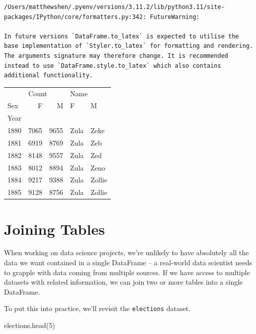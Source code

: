 \documentclass[
  letterpaper,
  DIV=11,
  numbers=noendperiod]{scrreprt}
\newenvironment{Shaded}{\begin{snugshade}}{\end{snugshade}}
\newcommand{\DecValTok}[1]{\textcolor[rgb]{0.68,0.00,0.00}{#1}}
\newcommand{\NormalTok}[1]{\textcolor[rgb]{0.00,0.23,0.31}{#1}}
\begin{document}
\begin{verbatim}
/Users/matthewshen/.pyenv/versions/3.11.2/lib/python3.11/site-packages/IPython/core/formatters.py:342: FutureWarning:

In future versions `DataFrame.to_latex` is expected to utilise the base implementation of `Styler.to_latex` for formatting and rendering. The arguments signature may therefore change. It is recommended instead to use `DataFrame.style.to_latex` which also contains additional functionality.
\end{verbatim}

\begin{tabular}{lrrll}
\toprule
{} & \multicolumn{2}{l}{Count} & \multicolumn{2}{l}{Name} \\
Sex &     F &     M &     F &       M \\
Year &       &       &       &         \\
\midrule
1880 &  7065 &  9655 &  Zula &    Zeke \\
1881 &  6919 &  8769 &  Zula &     Zeb \\
1882 &  8148 &  9557 &  Zula &     Zed \\
1883 &  8012 &  8894 &  Zula &    Zeno \\
1884 &  9217 &  9388 &  Zula &  Zollie \\
1885 &  9128 &  8756 &  Zula &  Zollie \\
\bottomrule
\end{tabular}

\hypertarget{joining-tables}{%
\section{Joining Tables}\label{joining-tables}}

When working on data science projects, we're unlikely to have absolutely
all the data we want contained in a single DataFrame -- a real-world
data scientist needs to grapple with data coming from multiple sources.
If we have access to multiple datasets with related information, we can
join two or more tables into a single DataFrame.

To put this into practice, we'll revisit the \texttt{elections} dataset.

\begin{Shaded}
\begin{Highlighting}[]
\NormalTok{elections.head(}\DecValTok{5}\NormalTok{)}
\end{Highlighting}
\end{Shaded}
\end{document}
